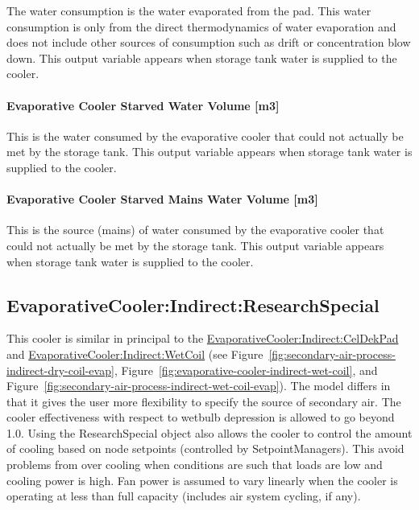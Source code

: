 The water consumption is the water evaporated from the pad. This water consumption is only from the direct thermodynamics of water evaporation and does not include other sources of consumption such as drift or concentration blow down. This output variable appears when storage tank water is supplied to the cooler.

\paragraph{Evaporative Cooler Starved Water Volume {[}m3{]}}\label{evaporative-cooler-starved-water-volume-m3-3}

This is the water consumed by the evaporative cooler that could not actually be met by the storage tank. This output variable appears when storage tank water is supplied to the cooler.

\paragraph{Evaporative Cooler Starved Mains Water Volume {[}m3{]}}\label{evaporative-cooler-starved-mains-water-volume-m3-3}

This is the source (mains) of water consumed by the evaporative cooler that could not actually be met by the storage tank. This output variable appears when storage tank water is supplied to the cooler.

\subsection{EvaporativeCooler:Indirect:ResearchSpecial}\label{evaporativecoolerindirectresearchspecial}

This cooler is similar in principal to the \hyperref[evaporativecoolerindirectceldekpad]{EvaporativeCooler:Indirect:CelDekPad} and \hyperref[evaporativecoolerindirectwetcoil]{EvaporativeCooler:Indirect:WetCoil} (see Figure~\ref{fig:secondary-air-process-indirect-dry-coil-evap}, Figure~\ref{fig:evaporative-cooler-indirect-wet-coil}, and Figure~\ref{fig:secondary-air-process-indirect-wet-coil-evap}). The model differs in that it gives the user more flexibility to specify the source of secondary air. The cooler effectiveness with respect to wetbulb depression is allowed to go beyond 1.0. Using the ResearchSpecial object also allows the cooler to control the amount of cooling based on node setpoints (controlled by SetpointManagers). This avoid problems from over cooling when conditions are such that loads are low and cooling power is high. Fan power is assumed to vary linearly when the cooler is operating at less than full capacity (includes air system cycling, if any).

